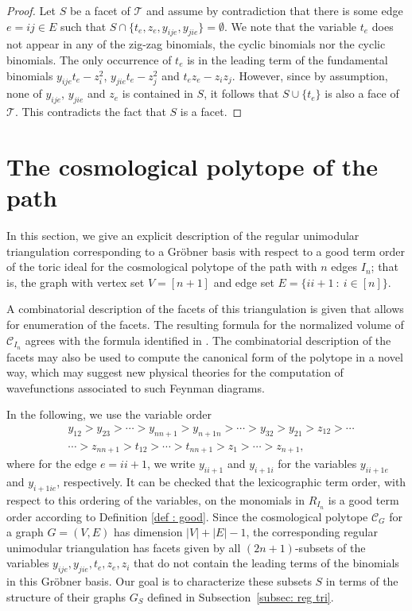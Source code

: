 \begin{proof}
    Let $S$ be a facet of $\mathcal{T}$ and assume by contradiction that there is some edge $e=ij\in E$ such that $S\cap\{t_e,z_e,y_{ije},y_{jie}\}=\emptyset$. We note that the variable $t_e$ does not appear in any of the zig-zag binomials, the cyclic binomials nor the cyclic binomials. The only occurrence of $t_e$ is in the leading term of the fundamental binomials $y_{ije}t_e-z_i^2$, $y_{jie}t_e-z_j^2$ and $t_ez_e-z_iz_j$. However, since by assumption, none of $y_{ije}$, $y_{jie}$ and $z_e$ is contained in $S$, it follows that $S\cup\{t_e\}$ is also a face of $\mathcal{T}$. This contradicts the fact that $S$ is a facet.
\end{proof}



\section{The cosmological polytope of the path}
\label{sec: the path}
In this section, we give an explicit description of the regular unimodular triangulation corresponding to a Gr\"obner basis with respect to a good term order of the toric ideal for the cosmological polytope of the path with $n$ edges $I_n$; that is, the graph with vertex set $V =[n+1]$ and edge set
$
E = \{ii+1~ :~ i\in[n]\}.
$

A combinatorial description of the facets of this triangulation is given that allows for enumeration of the facets.
The resulting formula for the normalized volume of $\mathcal{C}_{I_n}$ agrees with the formula identified in \cite{kuhne2022faces}.
The combinatorial description of the facets may also be used to compute the canonical form of the polytope in a novel way, which may suggest new physical theories for the computation of wavefunctions associated to such Feynman diagrams.

In the following, we use the variable order
\begin{equation}
\begin{split}
\label{eqn: path variable order}
&y_{12} > y_{23} > \cdots > y_{nn+1} > y_{n+1n} > \cdots > y_{32} > y_{21} > z_{12} > \cdots\\
&\cdots> z_{nn+1} > t_{12} > \cdots > t_{nn+1} > z_1 > \cdots > z_{n+1},
\end{split}
\end{equation}
where for the edge $e=ii+1$, we write $y_{ii+1}$ and $y_{i+1i}$ for the variables $y_{ii+1e}$ and $y_{i+1ie}$, respectively. 
It can be checked that the lexicographic term order, with respect to this ordering of the variables, on the monomials in $R_{I_n}$ is a good term order according to Definition \ref{def : good}.  
Since the cosmological polytope $\mathcal{C}_{G}$ for a graph $G = (V, E)$ has dimension $|V| + |E| -1$, the corresponding regular unimodular triangulation has facets given by all $(2n+1)$-subsets of the variables $y_{ije}, y_{jie}, t_e, z_e, z_i$ that do not contain the leading terms of the binomials in this Gr\"obner basis. Our goal is to characterize these subsets $S$ in terms of the structure of their graphs $G_S$ defined in Subsection~\ref{subsec: reg tri}.

